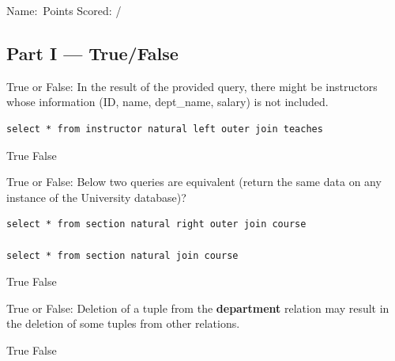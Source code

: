 \documentclass[12pt, addpoints, answers]{exam}
\begin{document}
\noindent Name:\ \makebox[3in]{\hrulefill}\hfill Points Scored: \underline{\hspace{3em}} / \numpoints
\begin{questions}

\section*{Part I — True/False}

\begin{minipage}{\linewidth}
\question[2]
True or False: In the result of the provided query, there might be instructors whose information (ID, name, dept\_name, salary) is not included.\par\vspace{0.5em}
\begin{verbatim}
select * from instructor natural left outer join teaches
\end{verbatim}
\begin{checkboxes}
    \choice True
    \CorrectChoice False
\end{checkboxes}
\end{minipage}\vspace{1em}

\begin{minipage}{\linewidth}
\question[2]
True or False: Below two queries are equivalent (return the same data on any instance of the University database)?\par\vspace{0.5em}
\begin{verbatim}
select * from section natural right outer join course

select * from section natural join course
\end{verbatim}
\begin{checkboxes}
    \choice True
    \CorrectChoice False
\end{checkboxes}
\end{minipage}\vspace{1em}

\begin{minipage}{\linewidth}
\question[2]
True or False: Deletion of a tuple from the \textbf{department} relation may result in the deletion of some tuples from other relations.\par\vspace{0.5em}
\begin{checkboxes}
    \choice True
    \CorrectChoice False
\end{checkboxes}
\end{minipage}\vspace{1em}


\end{questions}
\end{document}
